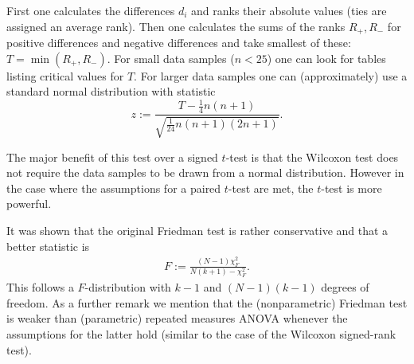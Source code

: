 {{        \qquad First one calculates the differences $d_i$ and ranks their absolute values (ties are assigned an average rank). Then one calculates the sums of the ranks $R_+, R_-$ for positive differences and negative differences and take smallest of these: $T=\min(R_+, R_-)$. For small data samples ($n<25$) one can look for tables listing critical values for $T$. For larger data samples one can (approximately) use a standard normal distribution with statistic \[z := \frac{T-\frac{1}{4}n(n+1)}{\sqrt{\frac{1}{24}n(n+1)(2n+1)}}.\]
    }
    \begin{remark}
        The major benefit of this test over a signed $t$-test is that the Wilcoxon test does not require the data samples to be drawn from a normal distribution. However in the case where the assumptions for a paired $t$-test are met, the $t$-test is more powerful.
    \end{remark}


    \begin{remark}
        It was shown that the original Friedman test is rather conservative and that a better statistic is
        \begin{gather}
            F := \frac{(N-1)\chi^2_F}{N(k+1)-\chi^2_F}.
        \end{gather}
        This follows a $F$-distribution with $k-1$ and $(N-1)(k-1)$ degrees of freedom. As a further remark we mention that the (nonparametric) Friedman test is weaker than (parametric) repeated measures ANOVA whenever the assumptions for the latter hold (similar to the case of the Wilcoxon signed-rank test).
    \end{remark}

}
